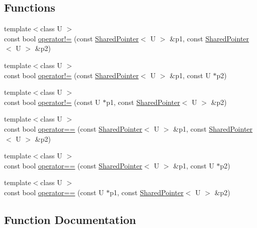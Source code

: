 \subsection*{Functions}
\begin{DoxyCompactItemize}
\item 
{\footnotesize template$<$class U $>$ }\\const bool \hyperlink{namespaceprism_1_1memory_ad36b37a525404c17827d12d0bf94bafd}{operator!=} (const \hyperlink{classprism_1_1memory_1_1_shared_pointer}{Shared\+Pointer}$<$ U $>$ \&p1, const \hyperlink{classprism_1_1memory_1_1_shared_pointer}{Shared\+Pointer}$<$ U $>$ \&p2)
\item 
{\footnotesize template$<$class U $>$ }\\const bool \hyperlink{namespaceprism_1_1memory_a96fb8161e2fb235063aad1597f1e9308}{operator!=} (const \hyperlink{classprism_1_1memory_1_1_shared_pointer}{Shared\+Pointer}$<$ U $>$ \&p1, const U $\ast$p2)
\item 
{\footnotesize template$<$class U $>$ }\\const bool \hyperlink{namespaceprism_1_1memory_aa8bd4c5e7758c889a6d5bf59bceacd7b}{operator!=} (const U $\ast$p1, const \hyperlink{classprism_1_1memory_1_1_shared_pointer}{Shared\+Pointer}$<$ U $>$ \&p2)
\item 
{\footnotesize template$<$class U $>$ }\\const bool \hyperlink{namespaceprism_1_1memory_a5c9e5536158a5a55c58650ee25b579e7}{operator==} (const \hyperlink{classprism_1_1memory_1_1_shared_pointer}{Shared\+Pointer}$<$ U $>$ \&p1, const \hyperlink{classprism_1_1memory_1_1_shared_pointer}{Shared\+Pointer}$<$ U $>$ \&p2)
\item 
{\footnotesize template$<$class U $>$ }\\const bool \hyperlink{namespaceprism_1_1memory_aa56d131347659ff3d6740a577a838051}{operator==} (const \hyperlink{classprism_1_1memory_1_1_shared_pointer}{Shared\+Pointer}$<$ U $>$ \&p1, const U $\ast$p2)
\item 
{\footnotesize template$<$class U $>$ }\\const bool \hyperlink{namespaceprism_1_1memory_a202ce193aab3b8867cffa74dd76abd7c}{operator==} (const U $\ast$p1, const \hyperlink{classprism_1_1memory_1_1_shared_pointer}{Shared\+Pointer}$<$ U $>$ \&p2)
\end{DoxyCompactItemize}


\subsection{Function Documentation}
